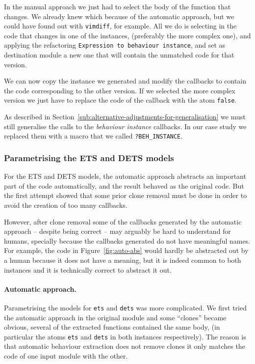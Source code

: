 In the manual approach we just had to select the body of the function that 
changes. We already knew which because of the automatic approach, but we could 
have found out with \texttt{vimdiff}, for example. All we do is selecting in 
the code that changes in one of the instances, (preferably the more complex 
one), and applying the refactoring \texttt{Expression to behaviour instance}, 
and set as destination module a new one that will contain the unmatched code 
for that version.

We can now copy the instance we generated and modify the callbacks to contain 
the code corresponding to the other version. If we selected the more complex 
version we just have to replace the code of the callback with the atom 
\texttt{false}.

As described in Section~\ref{sub:alternative-adjustments-for-generalisation} we 
must still generalise the calls to the \emph{behaviour instance} callbacks. In 
our case study we replaced them with a macro that we called 
\texttt{?BEH\_INSTANCE}.

\subsubsection{Parametrising the ETS and DETS models}

For the ETS and DETS models, the automatic approach abstracts an important part 
of the code automatically, and the result behaved as the original code. But the 
first attempt showed that some prior clone removal must be done
in order to avoid the creation of too many callbacks. 

However, after clone removal some of the callbacks generated
by the automatic approach -- despite being correct -- may arguably be hard to 
understand for humans, specially because the callbacks generated do not have 
meaningful names. For example, the code in Figure~\ref{fig:auto-abs} would 
hardly be abstracted out by a human because it does not have a meaning, but it 
is indeed common to both instances and it is technically correct to abstract it 
out.

\paragraph{Automatic approach.}

Parametrising the models for \texttt{ets} and \texttt{dets} was more 
complicated. We first tried the automatic approach in the original module and 
some ``clones'' became obvious, several of the extracted functions contained 
the same body, (in particular the atoms \texttt{ets} and \texttt{dets} in both 
instances respectively). The reason is that automatic behaviour extraction does 
not remove clones it only matches the code of one input module with the other.

